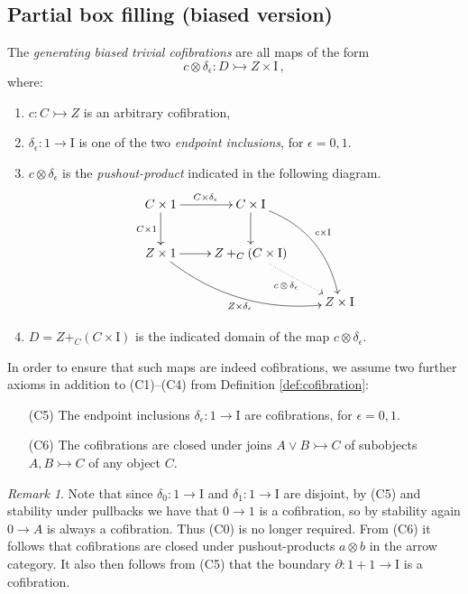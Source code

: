 \documentclass[11pt]{amsart}
\newcommand{\mono}{\ensuremath{\rightarrowtail}}
\newcommand{\ra}{\ensuremath{\rightarrow}}
\renewcommand{\to}{\ensuremath{\rightarrow}}
\newcommand{\I}{\ensuremath{\mathrm{I}}}
\newcommand{\del}{\ensuremath{\partial}}
\theoremstyle{remark}
\newtheorem{remark}[theorem]{Remark}
\theoremstyle{definition}
\begin{document}
\subsection{Partial box filling (biased version)}\label{sec:biasedfibration}

The \emph{generating biased trivial cofibrations} are all maps of the form
\begin{equation}\label{eq:genclassTCof}
c \otimes \delta_\epsilon : D \mono Z\times \I\,,
\end{equation}
where:
\begin{enumerate}
\item  $c : C \mono Z$ is an arbitrary cofibration,

\item $\delta_\epsilon : 1 \ra \I$ is one of the two \emph{endpoint inclusions}, for $\epsilon = 0,1$.

\item $c\otimes\delta_\epsilon$ is the \emph{pushout-product} indicated in the following diagram.
\begin{equation}\label{diagram:pushoutproduct}
\xymatrix{
C\times 1 \ar[d]_{C\times 1} \ar[r]^{C\times \delta_\epsilon} & C\times \I \ar[d] \ar@/^4ex/ [rdd]^{c\times \I}\\
Z\times 1 \ar@/_4ex/ [rrd]_{Z\times \delta_\epsilon} \ar[r] &  Z +_C (C\times\I) \ar@{..>}[rd]_{c\, \otimes\, \delta_\epsilon} \\
&& Z\times\I
}
\end{equation}

\item $D = Z +_C (C\times\I)$ is the indicated domain of the map $c \otimes \delta_\epsilon$.
\end{enumerate}

In order to ensure that such maps are indeed cofibrations, we assume two further axioms in addition to (C1)--(C4) from Definition \ref{def:cofibration}:
\begin{enumerate}\label{cofibration_axioms}
\item[(C5)] The endpoint inclusions $\delta_\epsilon : 1 \ra \I$ are cofibrations, for $\epsilon = 0,1$.
\item[(C6)] The cofibrations are closed under joins $A\vee B \mono C$ of subobjects $A, B \mono C$ of any object $C$.
\end{enumerate}
%
\begin{remark}\label{rem:somecofibs}
Note that since $\delta_0: 1\to\I$ and $\delta_1:1\to\I$ are disjoint, by (C5) and stability under pullbacks we have that $0 \ra 1$ is a cofibration, so by stability again $0\ra A$ is always a cofibration.  Thus (C0) is no longer required.  From (C6) it follows that cofibrations are closed under pushout-products ${a}\otimes{b}$ in the arrow category.  It also then follows from (C5) that the boundary $\del : 1+1 \to \I$ is a cofibration.
\end{remark}
\end{document}
